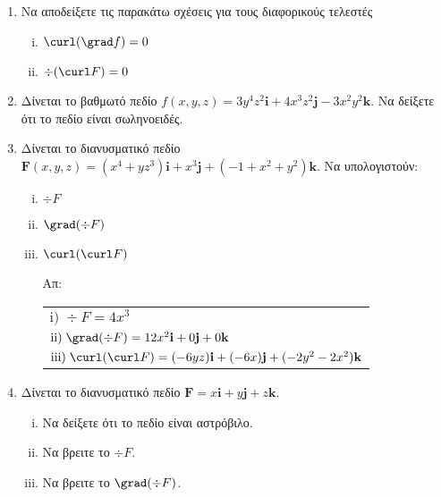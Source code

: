 


\pagestyle{askhseis}
\everymath{\displaystyle}
\renewcommand{\vec}{\mathbf}



\begin{center}
  \minibox{\large\bf \textcolor{Col1}{Ασκήσεις Κλίση, Απόκλιση, Στροβιλισμός}}
\end{center}

\vspace{\baselineskip}

\begin{enumerate}

\item Να αποδείξετε τις παρακάτω σχέσεις για τους διαφορικούς τελεστές

\begin{enumerate}[i)]
\item $\curl(\grad f)=0$
\item $\div(\curl F)=0$
\end{enumerate}

\item Δίνεται το βαθμωτό πεδίο 
  $f(x,y,z)=3y^4z^2\vec{i}+4x^3z^2\vec{j}-3x^2y^2\vec{k}$. Να δείξετε ότι το 
  πεδίο είναι σωληνοειδές.

\item Δίνεται το διανυσματικό πεδίο 
  $\boldsymbol{F}(x,y,z)=(x^4+yz^3)\vec{i}+x^3\vec{j}+(-1+x^2+y^2)\vec{k}$. 
  Να υπολογιστούν:
\begin{enumerate}[i)]
\item $\div F$
\item $\grad(\div F)$
\item $\curl(\curl F)$

\hfill Απ: \begin{tabular}{l}
  $\mathrm{i)}\; \div F=4x^3$ \\
  $\mathrm{ii)}\; \grad(\div F)=12x^2\vec{i}+0\vec{j}+0\vec{k}$ \\
  $\mathrm{iii)}\; \curl(\curl F)=(-6yz)\vec{i}+(-6x)\vec{j}+(-2y^2-2x^2)\vec{k}$
\end{tabular}

\end{enumerate}

\item Δίνεται το διανυσματικό πεδίο $\boldsymbol{F}=x\vec{i}+y\vec{j}+z\vec{k}$. 
\begin{enumerate}[i)]
\item Να δείξετε ότι το πεδίο είναι αστρόβιλο.
\item Να βρειτε το $\div F$.
\item Να βρειτε το $\grad(\div F)$.
\end{enumerate}


\end{enumerate}
